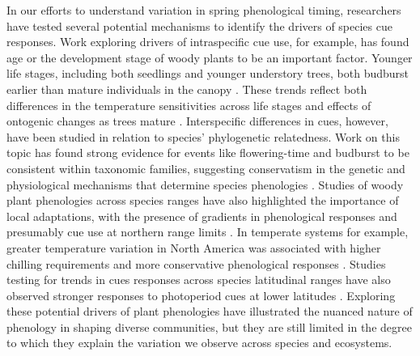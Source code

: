 \documentclass{article}\usepackage[]{graphicx}\usepackage[]{color}
\begin{document}
In our efforts to understand variation in spring phenological timing, researchers have tested several potential mechanisms to identify the drivers of species cue responses. Work exploring drivers of intraspecific cue use, for example, has found age or the development stage of woody plants to be an important factor. Younger life stages, including both seedlings and younger understory trees, both budburst earlier than mature individuals in the canopy \citep{Vitasse2013,Seiwa1991}. These trends reflect both differences in the temperature sensitivities across life stages and effects of ontogenic changes as trees mature \citep{Vitasse2013,Seiwa1991}. Interspecific differences in cues, however, have been studied in relation to species' phylogenetic relatedness. Work on this topic has found strong evidence for events like flowering-time and budburst to be consistent within taxonomic families, suggesting conservatism in the genetic and physiological mechanisms that determine species phenologies \citep{Kochmer1986,Davies2013,Gougherty2018}. Studies of woody plant phenologies across species ranges have also highlighted the importance of local adaptations, with the presence of gradients in phenological responses and presumably cue use at northern range limits \citep{Lechowicz1984,Chuine2001,Chuine2010}. In temperate systems for example, greater temperature variation in North America was associated with higher chilling requirements and more conservative phenological responses \citep{Zohner2017}.  Studies testing for trends in cues responses across species latitudinal ranges have also observed stronger responses to photoperiod cues at lower latitudes \citep{Zohner2016}. Exploring these potential drivers of plant phenologies have illustrated the nuanced nature of phenology in shaping diverse communities, but they are still limited in the degree to which they explain the variation we observe across species and ecosystems.\\
\end{document}
